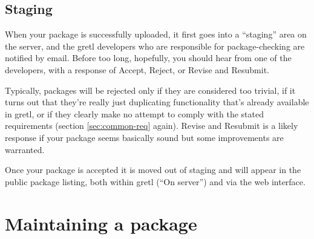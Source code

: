\documentclass[oneside]{book}
\begin{document}
\begin{script}[htbp]
  \centering
  \caption{Shell scripts for uploading packages}
  \label{ex:curl-upload}
\end{script}

\subsection{Staging}

When your package is successfully uploaded, it first goes into a
``staging'' area on the server, and the gretl developers who are
responsible for package-checking are notified by email. Before too
long, hopefully, you should hear from one of the developers, with a
response of Accept, Reject, or Revise and Resubmit.

Typically, packages will be rejected only if they are considered too
trivial, if it turns out that they're really just duplicating
functionality that's already available in gretl, or if they clearly
make no attempt to comply with the stated requirements (section
\ref{sec:common-req} again). Revise and Resubmit is a likely response
if your package seems basically sound but some improvements are
warranted.

Once your package is accepted it is moved out of staging and will
appear in the public package listing, both within gretl (``On
server'') and via the web interface.


\section{Maintaining a package}
\label{sec:maint}
\end{document}
